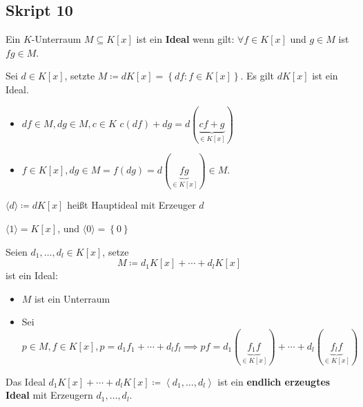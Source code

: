\subsection{Skript 10}

\begin{subdefinition}
	Ein $ K $-Unterraum $ M \subseteq K[x] $ ist ein \textbf{Ideal} wenn gilt: $ \forall f \in K[x] $ und $ g \in M $ ist $ fg \in M $.
\end{subdefinition}

\begin{subexample}
	Sei $ d \in K[x] $, setzte $ M \coloneqq d K[x] = \left\{ df : f \in K[x] \right\}  $.
	Es gilt $ d K[x] $ ist ein Ideal.
	\begin{itemize}
		\item $ df \in M, dg \in M, c \in K $ $ c(df) + dg = d(\underbrace{cf + g}_{\in K[x]}) $
		\item $ f \in K[x], dg \in M = f(dg) = d(\underbrace{fg}_{\in K[x]}) \in M $.
	\end{itemize}
\end{subexample}

\begin{subdefinition}
	$ \langle d \rangle \coloneqq dK[x] $ heißt Hauptideal mit Erzeuger $ d $
\end{subdefinition}

\begin{subexample}
	$ \langle 1 \rangle = K[x] $, und $ \langle 0 \rangle = \left\{ 0 \right\} $
\end{subexample}

\begin{subexample}
	Seien $ d_1, \dotsc, d_l \in K[x] $, setze
	\[
		M \coloneqq d_1K[x] + \dotsb + d_l K[x]
	\]
	ist ein Ideal:
	\begin{itemize}
		\item $ M $ ist ein Unterraum  
		\item Sei $ p \in M, f \in K[x], p = d_1f_1 + \dotsb + d_l f_l \implies pf = d_1(\underbrace{f_1f}_{\in K[x]}) + \dotsb + d_l(\underbrace{f_lf}_{\in K[x]}) $
	\end{itemize}
\end{subexample}

\begin{subdefinition}
	Das Ideal $ d_1K[x] + \dotsb + d_lK[x] \coloneqq \left< d_1, \dotsc, d_l \right> $ ist ein \textbf{endlich erzeugtes Ideal} mit Erzeugern $ d_1, \dotsc, d_l $.
\end{subdefinition}

